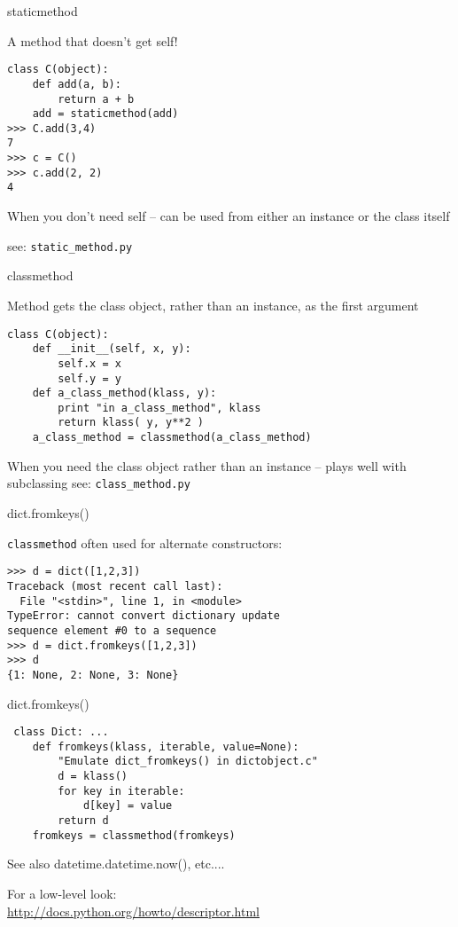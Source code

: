 \documentclass{beamer}
\begin{document}
\begin{frame}[fragile]{staticmethod}

{ \Large A method that doesn't get self! }

\begin{verbatim}
class C(object):
    def add(a, b):
        return a + b
    add = staticmethod(add)
>>> C.add(3,4)
7
>>> c = C()
>>> c.add(2, 2)
4
\end{verbatim}
{\Large When you don't need self -- can be used from either an instance or the class itself}

\vfill
see: \verb|static_method.py|
\end{frame} 

\begin{frame}[fragile]{classmethod}

{ \Large Method gets the class object, rather than an instance, as the first argument}

\begin{verbatim}
class C(object):
    def __init__(self, x, y):
        self.x = x
        self.y = y
    def a_class_method(klass, y):
        print "in a_class_method", klass
        return klass( y, y**2 )
    a_class_method = classmethod(a_class_method)
\end{verbatim}
{\Large When you need the class object rather than an instance -- plays well with subclassing}
\vfill
see: \verb|class_method.py|
\end{frame} 

\begin{frame}[fragile]{dict.fromkeys()}

{ \Large \verb|classmethod| often used for alternate constructors:}

\begin{verbatim}
>>> d = dict([1,2,3])
Traceback (most recent call last):
  File "<stdin>", line 1, in <module>
TypeError: cannot convert dictionary update
sequence element #0 to a sequence
>>> d = dict.fromkeys([1,2,3])
>>> d
{1: None, 2: None, 3: None}
\end{verbatim}

\end{frame} 

\begin{frame}[fragile]{dict.fromkeys()}

\begin{verbatim}
￼class Dict: ...
    def fromkeys(klass, iterable, value=None):
        "Emulate dict_fromkeys() in dictobject.c"
        d = klass()
        for key in iterable:
            d[key] = value
        return d
    fromkeys = classmethod(fromkeys)
\end{verbatim}

\vfill
{\Large See also datetime.datetime.now(), etc....}

\vfill
For a low-level look:\\
\url{http://docs.python.org/howto/descriptor.html}

\end{frame} 
\end{document}
